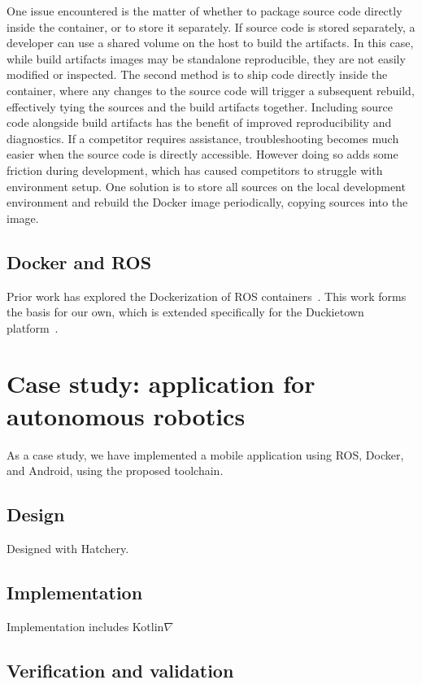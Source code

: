 \documentclass[12pt,initial,twoside,maitrise]{dms}
\numberwithin{equation}{section}
\numberwithin{table}{chapter}
\numberwithin{figure}{chapter}
\begin{document}
One issue encountered is the matter of whether to package source code directly inside the container, or to store it separately. If source code is stored separately, a developer can use a shared volume on the host to build the artifacts. In this case, while build artifacts images may be standalone reproducible, they are not easily modified or inspected. The second method is to ship code directly inside the container, where any changes to the source code will trigger a subsequent rebuild, effectively tying the sources and the build artifacts together. Including source code alongside build artifacts has the benefit of improved reproducibility and diagnostics. If a competitor requires assistance, troubleshooting becomes much easier when the source code is directly accessible. However doing so adds some friction during development, which has caused competitors to struggle with environment setup. One solution is to store all sources on the local development environment and rebuild the Docker image periodically, copying sources into the image.

\section{Docker and ROS}

Prior work has explored the Dockerization of ROS containers~\cite{white2017ros-docker}. This work forms the basis for our own, which is extended specifically for the Duckietown platform~\cite{paull2017duckietown}.

\chapter{Case study: application for autonomous robotics}

As a case study, we have implemented a mobile application using ROS, Docker, and Android, using the proposed toolchain.

\section{Design}

Designed with Hatchery.

\section{Implementation}

Implementation includes Kotlin$\nabla$

\section{Verification and validation}
\end{document}
